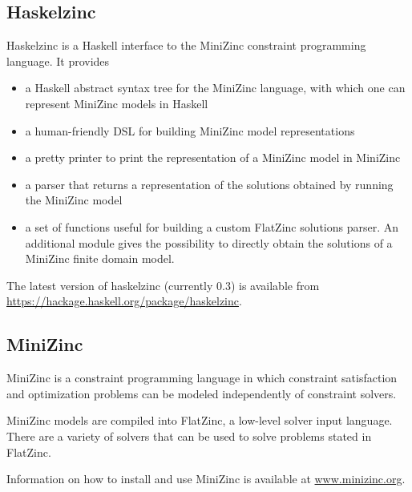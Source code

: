 \subsection{Haskelzinc}

Haskelzinc is a Haskell interface to the MiniZinc constraint
programming language.
%
It provides
\begin{itemize}
\item a Haskell abstract syntax tree for the MiniZinc language, with
  which one can represent MiniZinc models in Haskell
\item a human-friendly DSL for building MiniZinc model representations
\item a pretty printer to print the representation of a MiniZinc model
  in MiniZinc
\item a parser that returns a representation of the solutions obtained
  by running the MiniZinc model
\item a set of functions useful for building a custom FlatZinc
  solutions parser.
  An additional module gives the possibility to directly obtain the
  solutions of a MiniZinc finite domain model.
\end{itemize}

The latest version of haskelzinc (currently 0.3) is available from
\url{https://hackage.haskell.org/package/haskelzinc}.

\subsection{MiniZinc}

MiniZinc is a constraint programming language in which constraint satisfaction
and optimization problems can be modeled independently of constraint solvers.

MiniZinc models are compiled into FlatZinc, a low-level solver input language.
There are a variety of solvers that can be used to solve problems stated in
FlatZinc.

Information on how to install and use MiniZinc is available at
\url{www.minizinc.org}.
